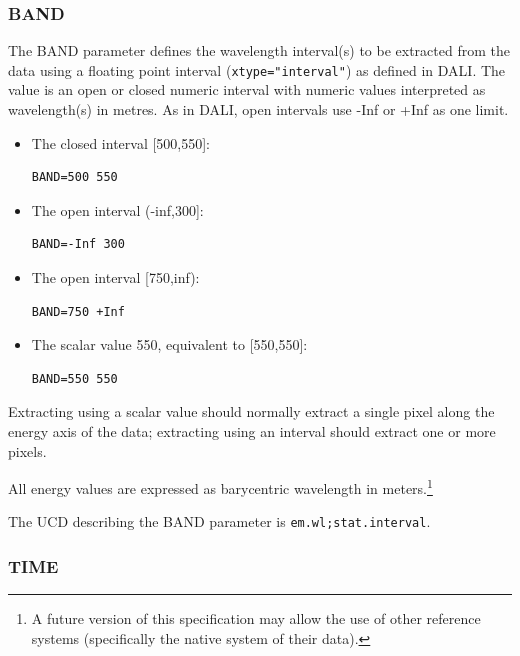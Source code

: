 \documentclass[11pt,a4paper]{ivoa}
\newcommand{\ucd}[1]{\texttt{#1}}
\begin{document}
\subsubsection{BAND}
\label{sec:BAND}

The BAND parameter defines the wavelength interval(s) to be extracted from
the data using a floating point interval (\verb|xtype="interval"|) as
defined in DALI.  The value is an open or closed numeric
interval with numeric values interpreted as wavelength(s) in metres. As
in DALI, open intervals use -Inf or +Inf as one limit.

\begin{itemize}
\item The closed interval [500,550]:

\begin{lstlisting}
BAND=500 550
\end{lstlisting}

\item The open interval (-inf,300]:

\begin{lstlisting}
BAND=-Inf 300
\end{lstlisting}

\item The open interval [750,inf):

\begin{lstlisting}
BAND=750 +Inf
\end{lstlisting}

\item The scalar value 550, equivalent to [550,550]:

\begin{lstlisting}
BAND=550 550
\end{lstlisting}

\end{itemize}

Extracting using a scalar value should normally extract a
single pixel along the energy axis of the data; extracting
using an interval should extract one or more pixels.

All energy values are expressed as barycentric wavelength in
meters.\footnote{A future version of this specification may allow the
use of other reference systems (specifically the native
system of their data).}

The UCD describing the BAND parameter is \ucd{em.wl;stat.interval}.


\subsubsection{TIME}
\label{sec:TIME}
\end{document}
